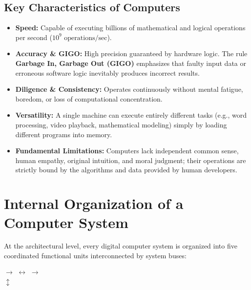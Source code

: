 \subsection{Key Characteristics of Computers}
\begin{itemize}[leftmargin=1.2em]
    \item \textbf{Speed:} Capable of executing billions of mathematical and logical operations per second ($10^9\text{ operations/sec}$).
    \item \textbf{Accuracy \& GIGO:} High precision guaranteed by hardware logic. The rule \textbf{Garbage In, Garbage Out (GIGO)} emphasizes that faulty input data or erroneous software logic inevitably produces incorrect results.
    \item \textbf{Diligence \& Consistency:} Operates continuously without mental fatigue, boredom, or loss of computational concentration.
    \item \textbf{Versatility:} A single machine can execute entirely different tasks (e.g., word processing, video playback, mathematical modeling) simply by loading different programs into memory.
    \item \textbf{Fundamental Limitations:} Computers lack independent common sense, human empathy, original intuition, and moral judgment; their operations are strictly bound by the algorithms and data provided by human developers.
\end{itemize}

\section{Internal Organization of a Computer System}

At the architectural level, every digital computer system is organized into five coordinated functional units interconnected by system buses:

\begin{center}
 $\longrightarrow$
 $\longleftrightarrow$
 $\longrightarrow$
 \\
\vspace{2mm}
$\updownarrow$ \\
\end{center}

